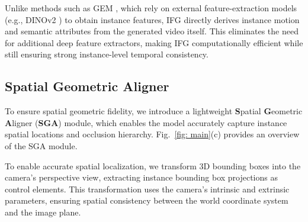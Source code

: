 Unlike methods such as GEM \cite{hassan2024gemgeneralizableegovisionmultimodal}, which rely on external feature-extraction models (e.g., DINOv2 \cite{oquab2024dinov2learningrobustvisual}) to obtain instance features, IFG directly derives instance motion and semantic attributes from the generated video itself. This eliminates the need for additional deep feature extractors, making IFG computationally efficient while still ensuring strong instance-level temporal consistency.




\subsection{Spatial Geometric Aligner}
\label{section: static}
To ensure spatial geometric fidelity, we introduce a lightweight \textbf{S}patial \textbf{G}eometric \textbf{A}ligner (\textbf{SGA}) module, which enables the model accurately capture instance spatial locations and occlusion hierarchy. Fig.~\ref{fig: main}(c) provides an overview of the SGA module.
 


To enable accurate spatial localization, we transform 3D bounding boxes into the camera's perspective view, extracting instance bounding box projections as control elements. This transformation uses the camera's intrinsic and extrinsic parameters, ensuring spatial consistency between the world coordinate system and the image plane.

